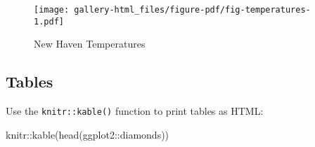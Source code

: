 \documentclass[
  letterpaper,
  DIV=11,
  numbers=noendperiod]{scrartcl}
\newenvironment{Shaded}{\begin{snugshade}}{\end{snugshade}}
\newcommand{\FunctionTok}[1]{\textcolor[rgb]{0.28,0.35,0.67}{#1}}
\newcommand{\NormalTok}[1]{\textcolor[rgb]{0.00,0.23,0.31}{#1}}
\newcommand{\SpecialCharTok}[1]{\textcolor[rgb]{0.37,0.37,0.37}{#1}}
\begin{document}
\begin{figure}[tbp]

{\centering \texttt{[image: gallery-html\_files/figure-pdf/fig-temperatures-1.pdf]}

}

\caption{\label{fig-temperatures}New Haven Temperatures}

\end{figure}

\hypertarget{tables}{%
\subsection{Tables}\label{tables}}

Use the \texttt{knitr::kable()} function to print tables as HTML:

\begin{Shaded}
\begin{Highlighting}[]
\NormalTok{knitr}\SpecialCharTok{::}\FunctionTok{kable}\NormalTok{(}\FunctionTok{head}\NormalTok{(ggplot2}\SpecialCharTok{::}\NormalTok{diamonds))}
\end{Highlighting}
\end{Shaded}
\end{document}
